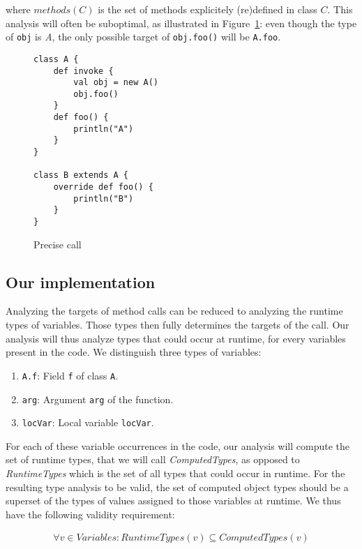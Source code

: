 where $methods(C)$ is the set of methods explicitely (re)defined in class $C$.
This analysis will often be suboptimal, as illustrated in
Figure~\ref{fig:ta:example2}: even though the type of \verb/obj/ is \emph{A},
the only possible target of \verb/obj.foo()/ will be \verb/A.foo/.

\begin{figure}[h]
    \centering

\begin{lstlisting}
class A {
    def invoke {
        val obj = new A()
        obj.foo()
    }
    def foo() {
        println("A")
    }
}

class B extends A {
    override def foo() {
        println("B")
    }
}
\end{lstlisting}

    \caption{Precise call}
    \label{fig:ta:example2}
\end{figure}

\subsection{Our implementation}
Analyzing the targets of method calls can be reduced to analyzing the runtime
types of variables. Those types then fully determines the targets of the call.
Our analysis will thus analyze types that could occur at runtime, for every
variables present in the code. We distinguish three types of variables:
\begin{enumerate}
    \item \verb/A.f/: Field \verb/f/ of class \verb/A/.
    \item \verb/arg/: Argument \verb/arg/ of the function.
    \item \verb/locVar/: Local variable \verb/locVar/.
\end{enumerate}

For each of these variable occurrences in the code, our analysis will compute
the set of runtime types, that we will call \emph{ComputedTypes}, as opposed to
\emph{RuntimeTypes} which is the set of all types that could occur in runtime.
For the resulting type analysis to be valid, the set of computed object types
should be a superset of the types of values assigned to those variables at
runtime.  We thus have the following validity requirement:

\begin{eqnarray*}
    \forall v \in Variables: RuntimeTypes(v) \subseteq ComputedTypes(v)
\end{eqnarray*}

